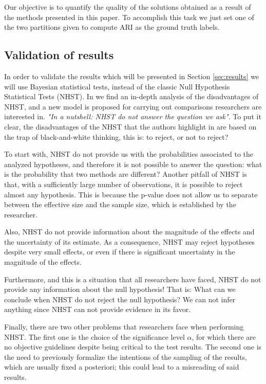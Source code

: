 \documentclass[review]{elsarticle}
\begin{document}
Our objective is to quantify the quality of the solutions obtained as a result of the methods presented in this paper. To accomplish this task we just set one of the two partitions given to compute ARI as the ground truth labels.

\subsection{Validation of results} \label{sec:ValidtnMethod}

In order to validate the results which will be presented in Section \ref{sec:results} we will use Bayesian statistical tests, instead of the classic Null Hypothesis Statistical Tests (NHST). In \cite{benavoli2017time} we find an in-depth analysis of the disadvantages of NHST, and a new model is proposed for carrying out comparisons researchers are interested in. \textit{"In a nutshell: NHST do not answer the question we ask"}. To put it clear, the disadvantages of the NHST that the authors highlight in \cite{benavoli2017time} are based on the trap of black-and-white thinking, this is: to reject, or not to reject?

To start with, NHST do not provide us with the probabilities associated to the analyzed hypotheses, and therefore it is not possible to answer the question: what is the probability that two methods are different? Another pitfall of NHST is that, with a sufficiently large number of observations, it is possible to reject almost any hypothesis. This is because the p-value does not allow us to separate between the effective size and the sample size, which is established by the researcher.

Also, NHST do not provide information about the magnitude of the effects and the uncertainty of its estimate. As a consequence, NHST may reject hypotheses despite very small effects, or even if there is significant uncertainty in the magnitude of the effects.

Furthermore, and this is a situation that all researchers have faced, NHST do not provide any information about the null hypothesis! That is: What can we conclude when NHST do not reject the null hypothesis? We can not infer anything since NHST can not provide evidence in its favor.

Finally, there are two other problems that researchers face when performing NHST. The first one is the choice of the significance level $\alpha$, for which there are no objective guidelines despite being critical to the test results. The second one is the need to previously formalize the intentions of the sampling of the results, which are usually fixed a posteriori; this could lead to a misreading of said results.
\end{document}
